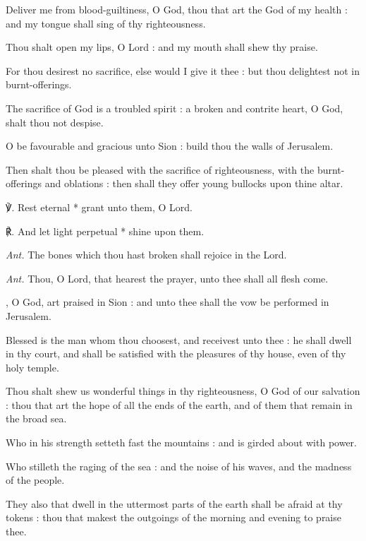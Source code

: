 Deliver me from blood-guiltiness, O God, thou that art the God of my health : and my tongue shall sing of thy righteousness.\par
{}Thou shalt open my lips, O Lord : and my mouth shall shew thy praise.\par
{}For thou desirest no sacrifice, else would I give it thee : but thou delightest not in burnt-offerings.\par
{}The sacrifice of God is a troubled spirit : a broken and contrite heart, O God, shalt thou not despise.\par
{}O be favourable and gracious unto Sion : build thou the walls of Jerusalem.\par
{}Then shalt thou be pleased with the sacrifice of righteousness, with the burnt-offerings and oblations : then shall they offer young bullocks upon thine altar.\par
℣. Rest eternal * grant unto them, O Lord.\par
℟. And let light perpetual * shine upon them.\par\noindent
\textit{Ant.} The bones which thou hast broken shall rejoice in the Lord.\par
{}\par\noindent
\textit{Ant.} Thou, O Lord, {\dag} that hearest the prayer, unto thee shall all flesh come.\par
{}, O God, art praised in Sion : and unto thee shall the vow be performed in Jerusalem.\par
{}
Blessed is the man whom thou choosest, and receivest unto thee : he shall dwell in thy court, and shall be satisfied with the pleasures of thy house, even of thy holy temple.\par
{}Thou shalt shew us wonderful things in thy righteousness, O God of our salvation : thou that art the hope of all the ends of the earth, and of them that remain in the broad sea.\par
{}Who in his strength setteth fast the mountains : and is girded about with power.\par
{}Who stilleth the raging of the sea : and the noise of his waves, and the madness of the people.\par
{}They also that dwell in the uttermost parts of the earth shall be afraid at thy tokens : thou that makest the outgoings of the morning and evening to praise thee.\par
